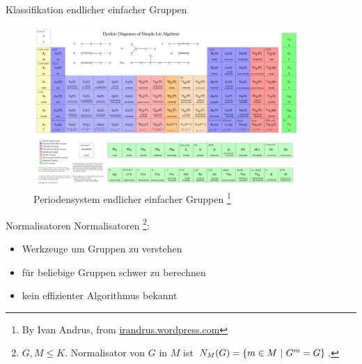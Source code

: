 
\begin{frame}{Klassifikation endlicher einfacher Gruppen}
%
\pause
\begin{figure}[h]
\centering
\includegraphics[width=0.9\textwidth]{./pictures/periodic-table-of-groups-cropped.pdf}
\caption{Periodensystem endlicher einfacher Gruppen%
\footnote{By Ivan Andrus, from
\href{https://irandrus.wordpress.com}{irandrus.wordpress.com}}
}
\end{figure}
\end{frame}


\begin{frame}{Normalisatoren}
Normalisatoren%
\footnote{$G, M \leq K$.
Normalisator von $G$ in $M$ ist
$N_M(G) = 
 \left\{  m \in M ~|~ G ^ m = G  \right\} 
$.
}:

\begin{itemize}
\item Werkzeuge um Gruppen zu verstehen
\pause
\item für beliebige Gruppen schwer zu berechnen
\pause
\item kein effizienter Algorithmus bekannt
\end{itemize}
\end{frame}


